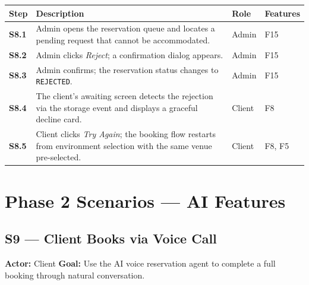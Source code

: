 \documentclass[12pt,a4paper,oneside]{report}
\begin{document}
\begin{longtable}{>{\bfseries}l L{6.2cm} l L{2.8cm}}
  \toprule
  Step & Description & Role & Features \\
  \midrule
  S8.1 & Admin opens the reservation queue and locates a pending request that
         cannot be accommodated. & Admin & F15 \\
  S8.2 & Admin clicks \emph{Reject}; a confirmation dialog appears. & Admin & F15 \\
  S8.3 & Admin confirms; the reservation status changes to \texttt{REJECTED}. & Admin & F15 \\
  S8.4 & The client's awaiting screen detects the rejection via the storage event
         and displays a graceful decline card. & Client & F8 \\
  S8.5 & Client clicks \emph{Try Again}; the booking flow restarts from
         environment selection with the same venue pre-selected. & Client & F8, F5 \\
  \bottomrule
\end{longtable}

\section*{Phase 2 Scenarios --- AI Features}

\subsection*{S9 --- Client Books via Voice Call}
\begin{mdframed}[style=scenariobox]
\textbf{Actor:} Client \quad
\textbf{Goal:} Use the AI voice reservation agent to complete a full booking
through natural conversation.
\end{mdframed}
\end{document}
